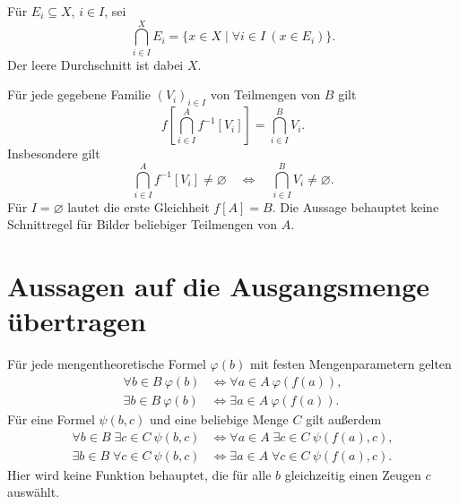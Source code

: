 \begin{definition}
Für $E_i\subseteq X$, $i\in I$, sei
\[
 \bigcap_{i\in I}^{X}E_i
   =\{x\in X\mid\forall i\in I\ (x\in E_i)\}.
\]
Der leere Durchschnitt ist dabei $X$.
\end{definition}

\begin{theorem}
\label{b07guide:thm:intersection}
Für jede gegebene Familie $(V_i)_{i\in I}$ von Teilmengen von $B$ gilt
\[
 f\left[\bigcap_{i\in I}^{A}f^{-1}[V_i]\right]
     =\bigcap_{i\in I}^{B}V_i.
\]
Insbesondere gilt
\[
 \bigcap_{i\in I}^{A}f^{-1}[V_i]\ne\varnothing
 \quad\Longleftrightarrow\quad
 \bigcap_{i\in I}^{B}V_i\ne\varnothing.
\]
Für $I=\varnothing$ lautet die erste Gleichheit $f[A]=B$.
Die Aussage behauptet keine Schnittregel für Bilder
beliebiger Teilmengen von $A$.
\end{theorem}

\section{Aussagen auf die Ausgangsmenge übertragen}

\begin{theorem}
\label{b07guide:thm:quantifiers}
Für jede mengentheoretische Formel $\varphi(b)$ mit festen
Mengenparametern gelten
\[
 \begin{aligned}
 \forall b\in B\ \varphi(b)
   &\Longleftrightarrow \forall a\in A\ \varphi(f(a)),\\
 \exists b\in B\ \varphi(b)
   &\Longleftrightarrow \exists a\in A\ \varphi(f(a)).
 \end{aligned}
\]
Für eine Formel $\psi(b,c)$ und eine beliebige Menge $C$ gilt außerdem
\[
 \begin{aligned}
 \forall b\in B\;\exists c\in C\ \psi(b,c)
 &\Longleftrightarrow
   \forall a\in A\;\exists c\in C\ \psi(f(a),c),\\
 \exists b\in B\;\forall c\in C\ \psi(b,c)
 &\Longleftrightarrow
   \exists a\in A\;\forall c\in C\ \psi(f(a),c).
 \end{aligned}
\]
Hier wird keine Funktion behauptet, die für alle $b$
gleichzeitig einen Zeugen $c$ auswählt.
\end{theorem}